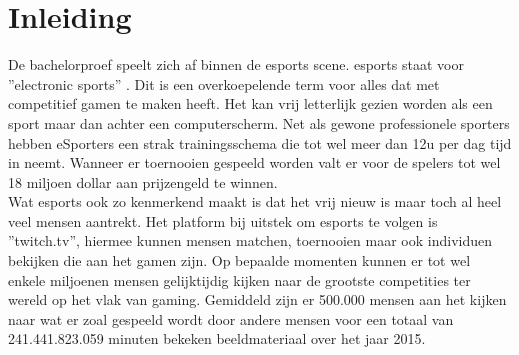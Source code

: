 \documentclass[pdftex,a4paper,12pt,twoside]{report}
\begin{document}


\tableofcontents

\printglossary

\chapter{Inleiding}
\label{ch:inleiding}

De bachelorproef speelt zich af binnen de \gls{esports} scene. \gls{esports} staat voor ''electronic sports'' \citep{BenDirs2015}. Dit is een overkoepelende term voor alles dat met competitief gamen te maken heeft. Het kan vrij letterlijk gezien worden als een sport maar dan achter een computerscherm. Net als gewone professionele sporters hebben eSporters een strak trainingsschema die tot wel meer dan 12u per dag tijd in neemt. Wanneer er toernooien gespeeld worden valt er voor de spelers tot wel 18 miljoen dollar aan prijzengeld te winnen. \citep{dota2theinternational} 
\\

Wat \gls{esports} ook zo kenmerkend maakt is dat het vrij nieuw is maar toch al heel veel mensen aantrekt. Het platform bij uitstek om \gls{esports} te volgen is ''\gls{twitch}.tv'', hiermee kunnen mensen matchen, toernooien maar ook individuen bekijken die aan het gamen zijn. Op bepaalde momenten kunnen er tot wel enkele miljoenen mensen gelijktijdig kijken naar de grootste competities ter wereld op het vlak van gaming. Gemiddeld zijn er 500.000 mensen aan het kijken naar wat er zoal gespeeld wordt door andere mensen voor een totaal van 241.441.823.059 minuten bekeken beeldmateriaal over het jaar 2015. \citep{twitchinfographic}
\newpage
\end{document}
